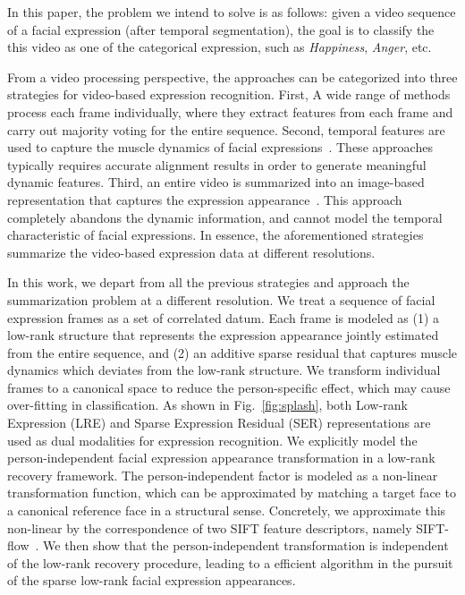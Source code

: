 \documentclass[journal]{IEEEtran}
\begin{document}
In this paper, the problem we intend to solve is as follows: given a video sequence of a facial expression (after temporal segmentation), the goal is to classify the this video as one of the categorical expression, such as \textit{Happiness}, \textit{Anger}, etc. 

From a video processing perspective, the approaches can be categorized into three strategies for video-based expression recognition. First, A wide range of methods~\cite{Bartlett_FG11}\cite{Valstar_SMCB12} process each frame individually, where they extract features from each frame and carry out majority voting for the entire sequence. Second, temporal features are used to capture the muscle dynamics of facial expressions~\cite{Zhao_PAMI07}\cite{Huang11}. These approaches typically requires accurate alignment results in order to generate meaningful dynamic features. Third, an entire video is summarized into an image-based representation that captures the expression appearance~\cite{Yang_SMCB12}\cite{Dahmane_TMM14}. This approach completely abandons the dynamic information, and cannot model the temporal characteristic of facial expressions. In essence, the aforementioned strategies summarize the video-based expression data at different resolutions. 

In this work, we depart from all the previous strategies and approach the summarization problem at a different resolution. We treat a sequence of facial expression frames as a set of correlated datum. Each frame is modeled as (1) a low-rank structure that represents the expression appearance jointly estimated from the entire sequence, and (2) an additive sparse residual that captures muscle dynamics which deviates from the low-rank structure. We transform individual frames to a canonical space to reduce the person-specific effect, which may cause over-fitting in classification. As shown in Fig.~\ref{fig:splash}, both Low-rank Expression (LRE) and Sparse Expression Residual (SER) representations are used as dual modalities for expression recognition. We explicitly model the person-independent facial expression appearance transformation in a low-rank recovery framework. The person-independent factor is modeled as a non-linear transformation function, which can be approximated by matching a target face to a canonical reference face in a structural sense. Concretely, we approximate this non-linear by the correspondence of two SIFT feature descriptors, namely SIFT-flow~\cite{Liu_PAMI11}. We then show that the person-independent transformation is independent of the low-rank recovery procedure, leading to a efficient algorithm in the pursuit of the sparse low-rank facial expression appearances. 
\end{document}
